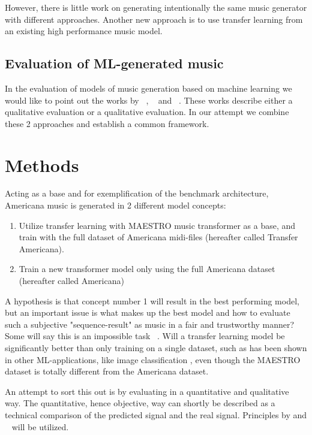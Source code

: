 \documentclass{IEEEtran}
\begin{document}
        However, there is little work on generating intentionally the same music generator
        with different approaches. Another new approach is to use transfer learning from
        an existing high performance music model.

        \subsection{Evaluation of ML-generated music}
        In the evaluation of models of music generation based on machine learning we
        would like to point out the works by \citeauthor{1030094}~\cite{1030094},
        \citeauthor{yang2020evaluation}~\cite{yang2020evaluation}
        and \citeauthor{wu2020jazz}~\cite{wu2020jazz}.
        These works describe either a qualitative evaluation or a qualitative evaluation.
        In our attempt we combine these 2 approaches and establish a common framework.

    \section{Methods}

        Acting as a base and for exemplification of the benchmark architecture,
        Americana music is generated in 2 different model concepts:
        \begin{enumerate}
            \item Utilize transfer learning with MAESTRO music transformer as a base,
                    and train with the full dataset of Americana midi-files (hereafter called Transfer Americana).
            \item Train a new transformer model only using the full Americana dataset (hereafter called Americana)
        \end{enumerate} 
        
        A hypothesis is that concept number 1 will result in the best performing model,
        but an important issue is what makes up the best model and how to evaluate such a
        subjective "sequence-result" as music in a fair and trustworthy manner? 
        Some will say this is an impossible task ~\cite{1030094}. Will a transfer learning model be significantly better than only training on a single dataset, such as has been shown in other ML-applications, like image classification \cite{7404017}, even though the MAESTRO dataset is totally different from the Americana dataset.

        An attempt to sort this out is by evaluating in a quantitative and qualitative way.
        The quantitative, hence objective, way can shortly be described as a technical
        comparison of the predicted signal and the real signal. Principles by \cite{yang2020evaluation} and ~\cite{wu2020jazz} will be utilized.
        
\end{document}
